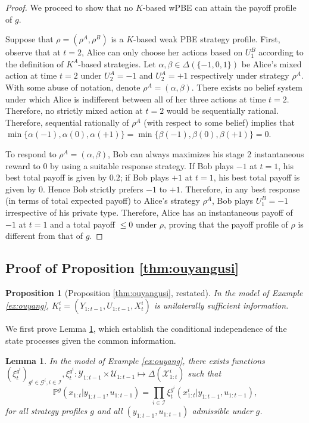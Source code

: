 \documentclass[pdflatex,sn-basic]{sn-jnl}
\renewcommand{\Pr}{\mathbb{P}}
\newcommand{\Comp}{K}
\theoremstyle{thmstyleone}%
\newtheorem{lemma}{Lemma}
\newtheorem{prop}{Proposition}
\theoremstyle{thmstyletwo}%
\theoremstyle{thmstylethree}%
\begin{document}
\begin{appendices}
\begin{proof}
    We proceed to show that no $\Comp$-based wPBE can attain the payoff profile of $g$.
	
	Suppose that $\rho = (\rho^A, \rho^B)$ is a $\Comp$-based weak PBE strategy profile. First, observe that at $t=2$, Alice can only choose her actions based on $U_1^B$ according to the definition of $\Comp^A$-based strategies. Let $\alpha, \beta\in \Delta(\{-1, 0, 1\})$ be Alice's mixed action at time $t=2$ under $U_2^A=-1$ and $U_2^A=+1$ respectively under strategy $\rho^A$. With some abuse of notation, denote $\rho^A = (\alpha, \beta)$.
	There exists no belief system under which Alice is indifferent between all of her three actions at time $t=2$. Therefore, no strictly mixed action at $t=2$ would be sequentially rational. Therefore, sequential rationally of $\rho^A$ (with respect to some belief) implies that $\min\{\alpha(-1), \alpha(0), \alpha(+1) \} = \min\{\beta(-1), \beta(0), \beta(+1) \} = 0$.
	
	To respond to $\rho^A = (\alpha, \beta)$, Bob can always maximizes his stage 2 instantaneous reward to 0 by using a suitable response strategy. If Bob plays $-1$ at $t=1$, his best total payoff is given by $0.2$; if Bob plays $+1$ at $t=1$, his best total payoff is given by $0$. Hence Bob strictly prefers $-1$ to $+1$. Therefore, in any best response (in terms of total expected payoff) to Alice's strategy $\rho^A$, Bob plays $U_1^B = -1$ irrespective of his private type. Therefore, Alice has an instantaneous payoff of $-1$ at $t=1$ and a total payoff $\leq 0$ under $\rho$, proving that the payoff profile of $\rho$ is different from that of $g$.
\end{proof}

\subsection{Proof of Proposition \ref{thm:ouyangusi}}\label{app:thm:ouyangusi}
\begin{prop}[Proposition \ref{thm:ouyangusi}, restated]
	In the model of Example \ref{ex:ouyang}, $\Comp_t^i=(Y_{1:t-1}, U_{1:t-1}, X_t^i)$ is unilaterally sufficient information.
\end{prop}

{We first prove Lemma \ref{lem:condindepouyang}, which establish the conditional independence of the state processes given the common information.}

\begin{lemma}\label{lem:condindepouyang}
	In the model of Example \ref{ex:ouyang}, there exists functions $(\xi_t^{g^i})_{g^i\in\mathcal{G}^i, i\in\mathcal
		I}, \xi_t^{g^i}: \mathcal{Y}_{1:t-1}\times \mathcal{U}_{1:t-1}\mapsto \Delta(\mathcal{X}_{1:t}^i)$ such that
	\begin{equation}
		\Pr^g(x_{1:t}|y_{1:t-1}, u_{1:t-1}) = \prod_{i\in\mathcal{I}} \xi_t^{g^i}(x_{1:t}^i|y_{1:t-1}, u_{1:t-1}),
	\end{equation}
	for all strategy profiles $g$ and all $(y_{1:t-1}, u_{1:t-1})$ admissible under $g$.
\end{lemma}


\end{appendices}
\end{document}
